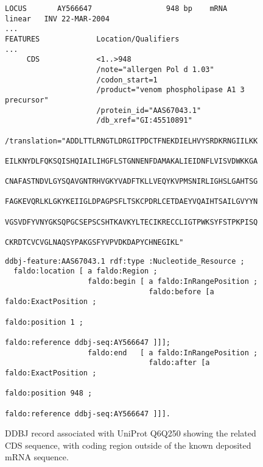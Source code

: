 \begin{figure}
\begin{shaded}
\small
\begin{verbatim}
LOCUS       AY566647                 948 bp    mRNA    linear   INV 22-MAR-2004
...
FEATURES             Location/Qualifiers
...
     CDS             <1..>948
                     /note="allergen Pol d 1.03"
                     /codon_start=1
                     /product="venom phospholipase A1 3 precursor"
                     /protein_id="AAS67043.1"
                     /db_xref="GI:45510891"
                     /translation="ADDLTTLRNGTLDRGITPDCTFNEKDIELHVYSRDKRNGIILKK
                     EILKNYDLFQKSQISHQIAILIHGFLSTGNNENFDAMAKALIEIDNFLVISVDWKKGA
                     CNAFASTNDVLGYSQAVGNTRHVGKYVADFTKLLVEQYKVPMSNIRLIGHSLGAHTSG
                     FAGKEVQRLKLGKYKEIIGLDPAGPSFLTSKCPDRLCETDAEYVQAIHTSAILGVYYN
                     VGSVDFYVNYGKSQPGCSEPSCSHTKAVKYLTECIKRECCLIGTPWKSYFSTPKPISQ
                     CKRDTCVCVGLNAQSYPAKGSFYVPVDKDAPYCHNEGIKL"
\end{verbatim}
\begin{verbatim}
ddbj-feature:AAS67043.1 rdf:type :Nucleotide_Resource ;
  faldo:location [ a faldo:Region ;
                   faldo:begin [ a faldo:InRangePosition ;
                                 faldo:before [a faldo:ExactPosition ;
                                              faldo:position 1 ;
                                              faldo:reference ddbj-seq:AY566647 ]]];
                   faldo:end   [ a faldo:InRangePosition ;
                                 faldo:after [a faldo:ExactPosition ;
                                              faldo:position 948 ;
                                              faldo:reference ddbj-seq:AY566647 ]]].
\end{verbatim}
\end{shaded}
\caption{DDBJ record associated with UniProt Q6Q250 showing the related CDS sequence, with coding region outside of the known deposited mRNA sequence.}
\label{fig:DDBJ}
\end{figure}




